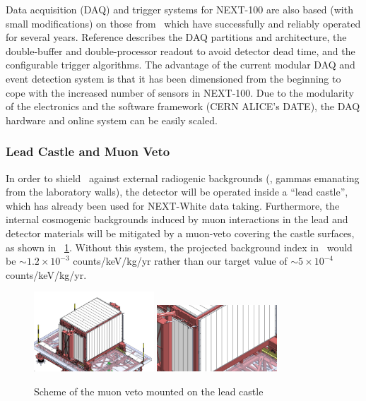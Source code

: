 \indent

Data acquisition (DAQ) and trigger systems for NEXT-100 are also based (with small modifications) on those from \NEW\, which have successfully and reliably operated for several years. Reference \cite{Esteve:2021a} describes the DAQ partitions and architecture, the double-buffer and double-processor readout to avoid detector dead time, and the configurable trigger algorithms. The advantage of the current modular DAQ and event detection system is that it has been dimensioned from the beginning to cope with the increased number of sensors in NEXT-100. Due to the modularity of the electronics and the software framework (CERN ALICE's DATE), the DAQ hardware and online system can be easily scaled.

\subsubsection{Lead Castle and Muon Veto}

In order to shield  \Next\ against external radiogenic backgrounds (\eg, gammas emanating from the laboratory walls), the detector will be operated inside a ``lead castle'', which has already been used for NEXT-White data taking. Furthermore, the internal cosmogenic backgrounds induced by muon interactions in the lead and detector materials will be mitigated by a muon-veto covering the castle surfaces, as shown in \ig\ \ref{fig.muonveto}.  Without this system, the projected background index in \Next\ would be $\sim1.2\times10^{-3}$ counts/keV/kg/yr rather than our target value of $\sim5\times10^{-4}$ counts/keV/kg/yr.   

\begin{figure}[htbp!]
\centering
\includegraphics[width=0.4\textwidth]{img2/MuonVeto_1.JPG}
\includegraphics[width=0.4\textwidth]{img2/MuonVeto_2.JPG}
\caption{\small Scheme of the muon veto mounted on the lead castle}
\label{fig.muonveto}
\end{figure}

